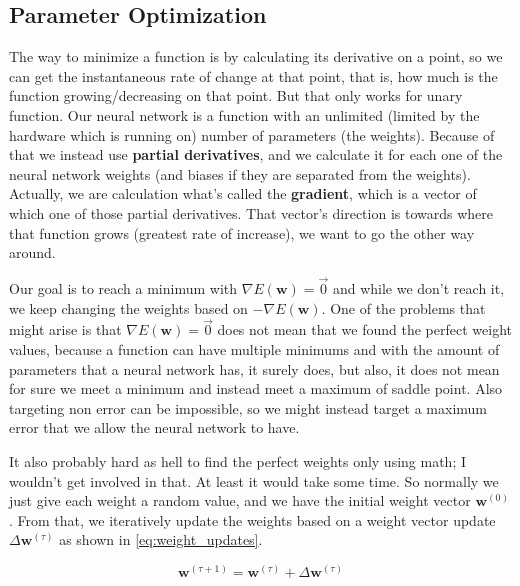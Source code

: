 \documentclass[a4paper,12pt]{article}
\theoremstyle{mytheoremstyle}
\theoremstyle{mytheoremstyle}
\theoremstyle{myproblemstyle}
\begin{document}
    \subsection{Parameter Optimization}

    The way to minimize a function is by calculating its derivative on a point,
    so we can get the instantaneous rate of change at that point, that is, how
    much is the function growing/decreasing on that point. But that only works
    for unary function. Our neural network is a function with an unlimited
    (limited by the hardware which is running on) number of parameters (the
    weights). Because of that we instead use \textbf{partial derivatives}, and
    we calculate it for each one of the neural network weights (and biases if
    they are separated from the weights). Actually, we are calculation what's
    called the \textbf{gradient}, which is a vector of which one of those
    partial derivatives. That vector's direction is towards where that function
    grows (greatest rate of increase), we want to go the other way around.

    Our goal is to reach a minimum with $ \nabla E \left( \mathbf{w} \right) =
    \vec{0} $ and while we don't reach it, we keep changing the weights based
    on $ -\nabla E \left( \mathbf{w} \right) $. One of the problems that might
    arise is that $ \nabla E \left( \mathbf{w} \right) = \vec{0} $ does not
    mean that we found the perfect weight values, because a function can have
    multiple minimums and with the amount of parameters that a neural network
    has, it surely does, but also, it does not mean for sure we meet a minimum
    and instead meet a maximum of saddle point. Also targeting non error can be
    impossible, so we might instead target a maximum error that we allow the
    neural network to have.

    It also probably hard as hell to find the perfect weights only using math;
    I wouldn't get involved in that. At least it would take some time. So
    normally we just give each weight a random value, and we have the initial
    weight vector $ \mathbf{w}^{\left( 0 \right)} $. From that, we iteratively
    update the weights based on a weight vector update $ \Delta
    \mathbf{w}^{\left( \tau \right)} $ as shown in \eqref{eq:weight_updates}.

    \begin{equation}
        \mathbf{w}^{\left( \tau + 1 \right)} = \mathbf{w}^{\left( \tau \right)} + \Delta \mathbf{w}^{\left( \tau \right)}
        \label{eq:weight_updates}
    \end{equation}
\end{document}
